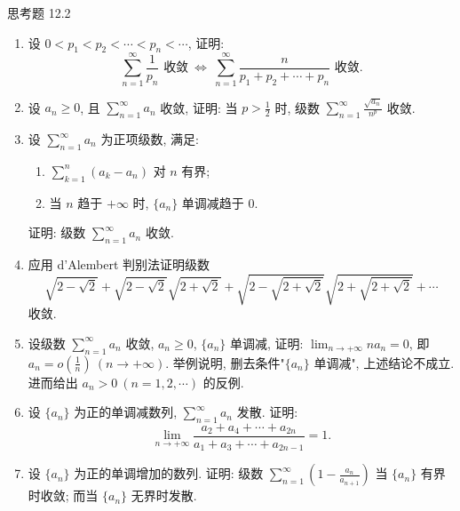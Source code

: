 \begin{exblock}{思考题 12.2}
\begin{enumerate}
\begin{enumerate}
  \end{enumerate}
  \item 设 $0<p_{1}<p_{2}<\cdots<p_{n}<\cdots$, 证明:
  \[
    \sum_{n=1}^{\infty}\frac{1}{p_{n}}\text{ 收敛}\ \Leftrightarrow\
    \sum_{n=1}^{\infty}\frac{n}{p_{1}+p_{2}+\cdots+p_{n}}\text{ 收敛}.
\]
  \item 设 $a_{n}\geqslant0$, 且 $\sum_{n=1}^{\infty}a_{n}$ 收敛, 证明: 当 $p>\frac{1}{2}$ 时, 级数 $\sum_{n=1}^{\infty}\frac{\sqrt{a_{n}}}{n^{p}}$ 收敛.
  \item 设 $\sum_{n=1}^{\infty}a_{n}$ 为正项级数, 满足:
  \begin{enumerate}
    \item[(1)] $\sum_{k=1}^{n}(a_{k}-a_{n})$ 对 $n$ 有界;
    \item[(2)] 当 $n$ 趋于 $+\infty$ 时, $\{a_{n}\}$ 单调减趋于 $0$.
  \end{enumerate}
  证明: 级数 $\sum_{n=1}^{\infty}a_{n}$ 收敛.
  \item 应用 d'Alembert 判别法证明级数
  \[
    \sqrt{2-\sqrt{2}}+\sqrt{2-\sqrt{2}}\sqrt{2+\sqrt{2}}
    +\sqrt{2-\sqrt{2+\sqrt{2}}}\sqrt{2+\sqrt{2+\sqrt{2}}}+\cdots
\]
  收敛.
  \item 设级数 $\sum_{n=1}^{\infty}a_{n}$ 收敛, $a_{n}\geqslant0$, $\{a_{n}\}$ 单调减, 证明: $\lim_{n\to+\infty}na_{n}=0$, 即 $a_{n}=o\left(\frac{1}{n}\right)\ (n\to+\infty)$. 举例说明, 删去条件"$\{a_{n}\}$ 单调减", 上述结论不成立. 进而给出 $a_{n}>0\ (n=1,2,\cdots)$ 的反例.
  \item 设 $\{a_{n}\}$ 为正的单调减数列, $\sum_{n=1}^{\infty}a_{n}$ 发散. 证明:
  \[
    \lim_{n\to+\infty}\frac{a_{2}+a_{4}+\cdots+a_{2n}}{a_{1}+a_{3}+\cdots+a_{2n-1}}=1.
\]
  \item 设 $\{a_{n}\}$ 为正的单调增加的数列. 证明: 级数 $\sum_{n=1}^{\infty}\left(1-\frac{a_{n}}{a_{n+1}}\right)$ 当 $\{a_{n}\}$ 有界时收敛; 而当 $\{a_{n}\}$ 无界时发散.
\end{enumerate}
\end{exblock}
